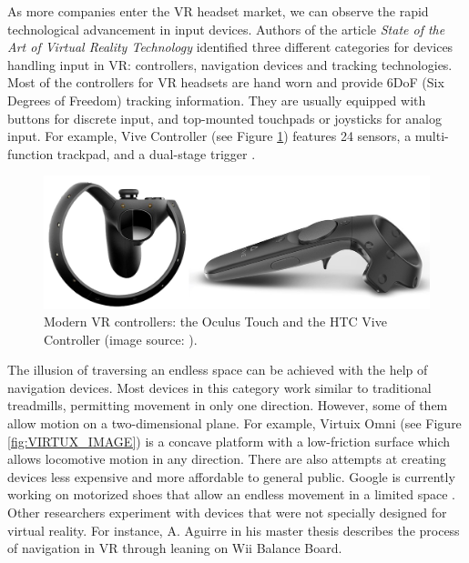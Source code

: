 As more companies enter the VR headset market, we can observe the rapid technological advancement in input devices. Authors of the article \textit{State of the Art of Virtual Reality Technology} \cite{VR_TECHNOLOGY} identified three different categories for devices handling input in VR: controllers, navigation devices and tracking technologies. Most of the controllers for VR headsets are hand worn and provide 6DoF (Six Degrees of Freedom) tracking information. They are usually equipped with buttons for discrete input, and top-mounted touchpads or joysticks for analog input. For example, Vive Controller (see Figure \ref{fig:CONTROLLERS_IMAGE}) features 24 sensors, a multi-function trackpad, and a dual-stage trigger \cite{VIVE_IMAGE}.

\begin{figure}[th]
\centering
\includegraphics[width=1\textwidth]{img/modern_controllers.png}
\caption{Modern VR controllers: the Oculus Touch and the HTC Vive Controller (image source: \cite{VR_TECHNOLOGY}\cite{VIVE_IMAGE}).}
\label{fig:CONTROLLERS_IMAGE}
\end{figure}

The illusion of traversing an endless space can be achieved with the help of navigation devices. Most devices in this category work similar to traditional treadmills, permitting movement in only one direction. However, some of them allow motion on a two-dimensional plane. For example, Virtuix Omni (see Figure \ref{fig:VIRTUX_IMAGE}) is a concave platform with a low-friction surface which allows locomotive motion in any direction. There are also attempts at creating devices less expensive and more affordable to general public. Google is currently working on motorized shoes that allow an endless movement in a limited space \cite{VR_SHOES}. Other researchers experiment with devices that were not specially designed for virtual reality. For instance, A. Aguirre in his master thesis \cite{JOYSTICK} describes the process of navigation in VR through leaning on Wii Balance Board.

